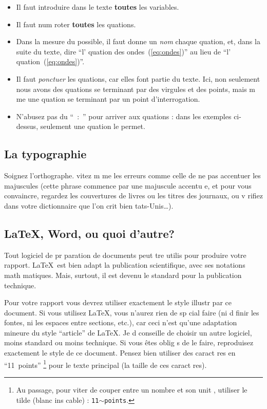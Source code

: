 \documentclass{article}
\begin{document}
\begin{itemize}
     \item  Il faut introduire dans le texte {\bfseries toutes} les variables.

     \item  Il faut num roter {\bfseries toutes} les  quations.

     \item  Dans la mesure du possible, il faut donne un \emph{nom\/}   
            chaque  quation, et, dans la suite du texte, dire 
            ``l' quation des ondes~(\ref{eq:ondes})'' 
            au lieu de ``l' quation~(\ref{eq:ondes})''.

     \item  Il faut \emph{ponctuer\/} les  quations, car elles font 
            partie du texte. Ici, non seulement nous avons des  quations 
            se terminant par des virgules et des points, mais m me 
            une  quation se terminant par un point d'interrogation.

     \item  N'abusez pas du ``~:~'' pour arriver aux  quations : 
            dans les exemples ci-dessus, seulement une  quation le permet.
\end{itemize}

\subsection{La typographie}

Soignez l'orthographe.  vitez m me les erreurs comme celle de ne pas accentuer 
les majuscules (cette phrase commence par une majuscule accentu e, et pour vous
 con\-vain\-cre, regardez les couvertures de livres ou les titres des
journaux, ou v rifiez dans votre dictionnaire que l'on  crit bien 
 tats-Unis\dots).

\subsection{\LaTeX, Word, ou quoi d'autre?}

Tout logiciel de pr paration de documents peut  tre utilis  pour produire 
votre rapport. \LaTeX \ est bien adapt    la publication scientifique, 
avec ses notations ma\-th \-ma\-ti\-ques. Mais, surtout, il est devenu le 
standard pour la publication technique.

Pour votre rapport vous devrez utiliser exactement le style illustr  par ce document. 
Si vous utilisez \LaTeX, vous n'aurez rien de sp cial   faire 
(ni   d finir les fontes, ni les espaces entre sections, etc.), car 
ceci n'est qu'une adaptation mineure du style ``article'' de \LaTeX.
Je d conseille de choisir un autre logiciel, moins standard ou moins technique.
Si vous \^{e}tes oblig s de le faire, reproduisez exactement le style de ce 
document. Pensez   bien utiliser des caract res en ``11~points'' 
\footnote{Au passage, pour  viter de couper entre un nombre et son unit , 
utiliser le tilde (blanc ins cable) : \texttt{11$\sim$points}.} 
pour le texte principal (la taille de ces caract res). 
\end{document}
